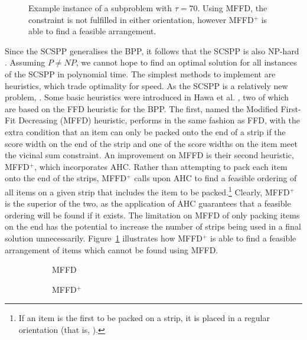 \documentclass{elsarticle}
\begin{document}
\begin{figure}[H]	
	\centering
	
	\caption{Example instance of a subproblem with $\tau = 70$. Using MFFD, the constraint is not fulfilled in either orientation, however MFFD$^+$ is able to find a feasible arrangement.}	
	\label{fig:mffdvsmffdp}
\end{figure}


Since the SCSPP generalises the BPP, it follows that the SCSPP is also NP-hard \cite{garey1979}. Assuming $P \neq NP$, we cannot hope to find an optimal solution for all instances of the SCSPP in polynomial time. The simplest methods to implement are heuristics, which trade optimality for speed. As the SCSPP is a relatively new problem, . Some basic heuristics were introduced in Hawa et al. \cite{hawa2018}, two of which are based on the FFD heuristic for the BPP. The first, named the Modified First-Fit Decreasing (MFFD) heuristic, performs in the same fashion as FFD, with the extra condition that an item can only be packed onto the end of a strip if the score width on the end of the strip and one of the score widths on the item meet the vicinal sum constraint. An improvement on MFFD is their second heuristic, MFFD$^+$, which incorporates AHC. Rather than attempting to pack each item onto the end of the strips, MFFD$^+$ calls upon AHC to find a feasible ordering of all items on a given strip that includes the item to be packed.\footnote{If an item is the first to be packed on a strip, it is placed in a regular orientation (that is, ).} Clearly, MFFD$^+$ is the superior of the two, as the application of AHC guarantees that a feasible ordering will be found if it exists. The limitation on MFFD of only packing items on the end has the potential to increase the number of strips being used in a final solution unnecessarily. Figure~\ref{fig:mffdvsmffdp} illustrates how MFFD$^+$ is able to find a feasible arrangement of items which cannot be found using MFFD.

\begin{figure}[H]	
	\centering
	\begin{subfigure}[h]{0.45\textwidth}
		
		\caption{MFFD}
		\label{fig:ffd}
	\end{subfigure} \hspace{10mm}
	\begin{subfigure}[h]{0.45\textwidth}
		
		\caption{MFFD$^+$}
		\label{fig:mffdplus}
	\end{subfigure}
	\caption{}
	\label{fig:packing}
\end{figure}
\end{document}
